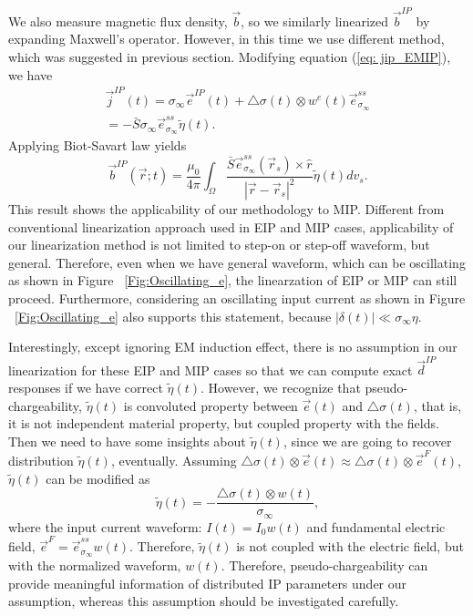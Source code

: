\documentclass[a4paper, 11pt]{article}
\newcommand{\siginf}{\sigma_\infty}
\newcommand{\dsig}{\triangle\sigma}
\renewcommand {\j}  { {\vec j} }
\renewcommand {\b}  { {\vec b} }
\newcommand {\e}  { {\vec e} }
\renewcommand {\d}  { {\vec d} }
\newcommand{\peta}{\tilde{\eta}}
\begin{document}
We also measure magnetic flux density, $\b$, so we similarly linearized $\b^{IP}$ by expanding Maxwell's operator. However, in this time we use different method, which was suggested in previous section. Modifying equation (\ref{eq: jip_EMIP}), we have
\begin{eqnarray}
    \j^{IP}(t) = \siginf\e^{IP}(t) + \dsig(t)\otimes w^e(t)\e^{ss}_{\siginf} \nonumber \\
            = -\bar{S}\siginf\e^{ss}_{\siginf}\peta(t).
\end{eqnarray}
Applying Biot-Savart law yields
\begin{equation}
  \b^{IP}(\vec{r}; t) = \frac{\mu_0}{4\pi}\int_{\Omega}  \frac{\bar{S}\e^{ss}_{\siginf}(\vec{r}_s)\times\hat{r}}{|\vec{r}-\vec{r}_s|^2}\peta(t)dv_s.
  \label{eq: BiotbIP_ss}
\end{equation}
This result shows the applicability of our methodology to MIP. Different from conventional linearization approach used in EIP and MIP cases, applicability of our linearization method is not limited to step-on or step-off waveform, but general. Therefore, even when we have general waveform, which can be oscillating as shown in Figure ~\ref{Fig:Oscillating_e}, the linearzation of EIP or MIP can still proceed. Furthermore, considering an oscillating input current as shown in Figure ~\ref{Fig:Oscillating_e} also supports this statement, because $|\delta(t)| \ll \siginf\eta$.

Interestingly, except ignoring EM induction effect, there is no assumption in our linearization for these EIP and MIP cases so that we can compute exact $\d^{IP}$ responses if we have correct $\peta(t)$. However, we recognize that pseudo-chargeability, $\peta(t)$ is convoluted property between $\e(t)$ and $\dsig(t)$, that is, it is not independent material property, but coupled property with the fields. Then we need to have some insights about $\peta(t)$, since we are going to recover distribution $\peta(t)$, eventually. Assuming $\dsig(t)\otimes \e(t) \approx \dsig(t)\otimes \e^F(t)$, $\peta(t)$ can be modified as
\begin{equation}
    \peta(t) = -\frac{\dsig(t)\otimes w(t)}{\siginf},
\end{equation}
where the input current waveform: $I(t) = I_0w(t)$ and fundamental electric field, $\e^{F} = \e^{ss}_{\siginf}w(t)$. Therefore, $\peta(t)$ is not coupled with the electric field, but with the normalized waveform, $w(t)$. Therefore, pseudo-chargeability can provide meaningful information of distributed IP parameters under our assumption, whereas this assumption should be investigated carefully.
\end{document}
